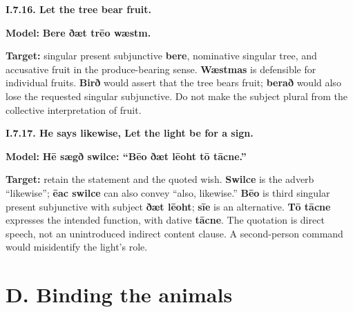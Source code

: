 \par\begin{minipage}{\linewidth}\raggedright
\textbf{I.7.16. Let the tree bear fruit.}

\textbf{Model:} \textbf{Bere ðæt trēo wæstm.}

\textbf{Target:} singular present subjunctive \textbf{bere}, nominative singular tree, and accusative fruit in the produce-bearing sense. \textbf{Wæstmas} is defensible for individual fruits. \textbf{Birð} would assert that the tree bears fruit; \textbf{berað} would also lose the requested singular subjunctive. Do not make the subject plural from the collective interpretation of fruit.

\end{minipage}\par\addvspace{4pt}

\par\begin{minipage}{\linewidth}\raggedright
\textbf{I.7.17. He says likewise, Let the light be for a sign.}

\textbf{Model:} \textbf{Hē sægð swilce: “Bēo ðæt lēoht tō tācne.”}

\textbf{Target:} retain the statement and the quoted wish. \textbf{Swilce} is the adverb “likewise”; \textbf{ēac swilce} can also convey “also, likewise.” \textbf{Bēo} is third singular present subjunctive with subject \textbf{ðæt lēoht}; \textbf{sīe} is an alternative. \textbf{Tō tācne} expresses the intended function, with dative \textbf{tācne}. The quotation is direct speech, not an unintroduced indirect content clause. A second-person command would misidentify the light’s role.

\end{minipage}\par\addvspace{4pt}

\section*{D. Binding the animals}

